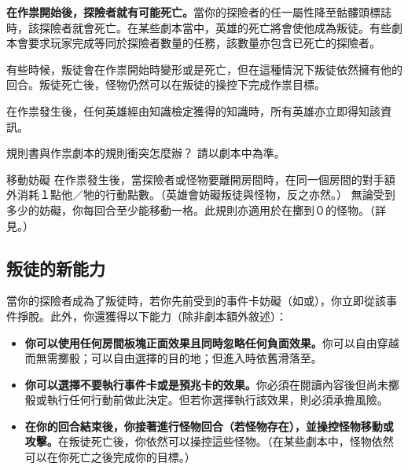 \textbf{在作祟開始後，探險者就有可能死亡。}當你的探險者的任一屬性降至骷髏頭標誌\SkullSymbol{}時，該探險者就會死亡。在某些劇本當中，英雄的死亡將會使他成為叛徒。有些劇本會要求玩家完成等同於探險者數量的任務，該數量亦包含已死亡的探險者。

有些時候，叛徒會在作祟開始時變形或是死亡，但在這種情況下叛徒依然擁有他的回合。叛徒死亡後，怪物仍然可以在叛徒的操控下完成作祟目標。

在作祟發生後，任何英雄經由知識檢定獲得的知識時，所有英雄亦立即得知該資訊。

\begin{RuleBox}{規則書與作祟劇本的規則衝突怎麼辦？}
  請以劇本中為準。
\end{RuleBox}

\begin{RuleBox}{移動妨礙}
  在作祟發生後，當探險者或怪物要離開房間時，在同一個房間的對手額外消耗１點他／牠的行動點數。（英雄會妨礙叛徒與怪物，反之亦然。）
  無論受到多少的妨礙，你每回合至少能移動一格。此規則亦適用於在擲到０的怪物。（詳見。）
\end{RuleBox}


\subsection{叛徒的新能力}\label{ssec:traitors-new-power}

當你的探險者成為了叛徒時，若你先前受到的事件卡妨礙（如或），你立即從該事件掙脫。此外，你還獲得以下能力（除非劇本額外敘述）：

\begin{itemize}
  \item \textbf{你可以使用任何房間板塊正面效果且同時忽略任何負面效果。}你可以自由穿越而無需擲骰；可以自由選擇的目的地；但進入時依舊滑落至。
  \item \textbf{你可以選擇不要執行事件卡或是預兆卡的效果。}你必須在閱讀內容後但尚未擲骰或執行任何行動前做此決定。但若你選擇執行該效果，則必須承擔風險。
  \item \textbf{在你的回合結束後，你接著進行怪物回合（若怪物存在），並操控怪物移動或攻擊。}在叛徒死亡後，你依然可以操控這些怪物。（在某些劇本中，怪物依然可以在你死亡之後完成你的目標。）
\end{itemize}

